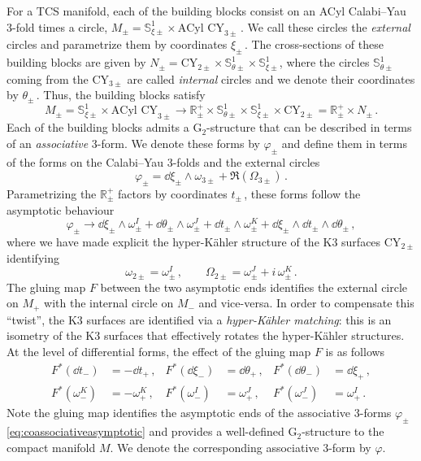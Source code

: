 \documentclass{pspum-l}
\newcommand*\Sc{\mathbb{S}}
\newcommand*\R{\mathbb{R}}
\theoremstyle{definition}
\theoremstyle{remark}
\numberwithin{equation}{section}
\begin{document}
For a TCS manifold, each of the building blocks consist on an ACyl Calabi--Yau 3-fold times a circle, $M_\pm=\Sc^1_{\xi\pm}\times\text{ACyl CY}_{3\pm}\,$. We call these circles the \emph{external} circles and parametrize them by coordinates $\xi_\pm\,$. The cross-sections of these building blocks are given by $N_\pm=\text{CY}_{2\pm}\times\Sc^1_{\theta\pm}\times\Sc^1_{\xi\pm}$, where the circles $\Sc^1_{\theta\pm}$ coming from the $\text{CY}_{3\pm}$ are called \emph{internal} circles and we denote their coordinates by $\theta_\pm\,$. Thus, the building blocks satisfy
\begin{equation}
\label{eq:TCSasymptoticbuildingblock}
    M_\pm=\Sc^1_{\xi\pm}\times\text{ACyl CY}_{3\pm}\longrightarrow\R^+_\pm\times\Sc^1_{\theta\pm}\times\Sc^1_{\xi\pm}\times\text{CY}_{2\pm}= \R^+_\pm\times N_\pm \, .
\end{equation}
Each of the building blocks admits a G$_2$-structure that can be described in terms of an \emph{associative} 3-form. We denote these forms by $\varphi_\pm$ and define them in terms of the forms on the Calabi--Yau 3-folds and the external circles
\begin{equation}
\label{eq:defassociative}
    \varphi_\pm=\dd\xi_\pm\wedge\omega_{3\pm}+\Re(\Omega_{3\pm})\, .
\end{equation}
Parametrizing the $\R^+_\pm$ factors by coordinates $t_\pm \,$, these forms follow the asymptotic behaviour
\begin{equation}
\label{eq:coassociativeasymptotic}
    \varphi_\pm\longrightarrow \dd\xi_\pm\wedge\omega^I_{\pm}+\dd\theta_\pm\wedge\omega^J_{\pm}+\dd t_\pm\wedge\omega^K_{\pm}+\dd\xi_\pm\wedge\dd t_\pm\wedge\dd\theta_\pm\, ,
\end{equation}
where we have made explicit the hyper-K\"ahler structure of the K3 surfaces $\text{CY}_{2\pm}$ identifying
\begin{equation}
    \omega_{2\pm}=\omega^I_\pm\, , \qquad \Omega_{2\pm}=\omega^J_\pm+i\,\omega^K_\pm \, .
\end{equation}
The gluing map $F$ between the two asymptotic ends identifies the external circle on $M_+$ with the internal circle on $M_-$ and vice-versa. In order to compensate this ``twist'', the K3 surfaces are identified via a \emph{hyper-K\"ahler matching}: this is an isometry of the K3 surfaces that effectively rotates the hyper-K\"ahler structures. At the level of differential forms, the effect of the gluing map $F$ is as follows
\begin{align}
\label{eq:TCSgluingmap1}
    F^*(\dd t_-)&=-\dd t_+\, ,& F^*(\dd\xi_-)&=\dd\theta_+\, ,& F^*(\dd\theta_-)&=\dd\xi_+\, , \\
    \label{eq:TCSgluingmap2}
    F^*(\omega^K_-)&=-\omega^K_+\, ,& F^*(\omega^I_-)&=\omega^J_+\, ,& F^*(\omega^J_-)&=\omega^I_+\, .
\end{align}
Note the gluing map identifies the asymptotic ends of the associative 3-forms $\varphi_\pm$ \eqref{eq:coassociativeasymptotic} and provides a well-defined G$_2$-structure to the compact manifold $M$. We denote the corresponding associative 3-form by $\varphi$.
\end{document}
